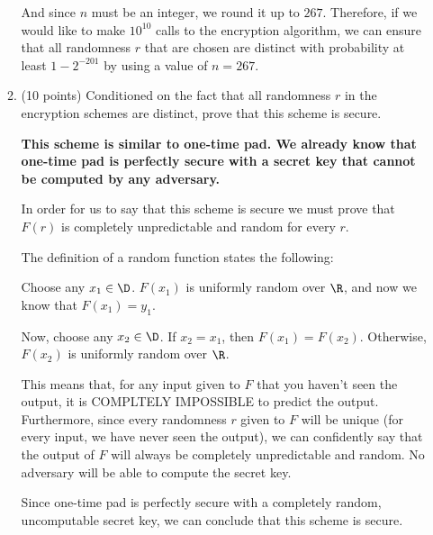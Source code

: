 \documentclass[11pt]{article}
\begin{document}
\begin{enumerate}
\begin{enumerate}
{      And since $n$ must be an integer, we round it up to $267$. Therefore, if we would like to make $10^{10}$ calls to the encryption algorithm, we can ensure that all randomness $r$ that are chosen are distinct with probability at least $1-2^{-201}$ by using a value of $n=267$.

    }
     \newpage

  \item (10 points) Conditioned on the fact that all randomness $r$ in the encryption schemes are distinct, prove that this scheme is secure. \newline 
    {\bfseries
      This scheme is similar to one-time pad. We already know that one-time pad is perfectly secure with a secret key that cannot be computed by any adversary. \newline

      In order for us to say that this scheme is secure we must prove that $F(r)$ is completely unpredictable and random for every $r$.  \newline


      The definition of a random function states the following: \newline

      Choose any $x_1 \in \D$. \newline
      $F(x_1)$ is uniformly random over $\R$, and now we know that $F(x_1) = y_1$. \newline

      Now, choose any $x_2 \in \D$. \newline
      If $x_2 = x_1$, then $F(x_1) = F(x_2)$. Otherwise, $F(x_2)$ is uniformly random over $\R$. \newline

      This means that, for any input given to $F$ that you haven't seen the output, it is COMPLTELY IMPOSSIBLE to predict the output. Furthermore, since every randomness $r$ given to $F$ will be unique (for every input, we have never seen the output), we can confidently say that the output of $F$ will always be completely unpredictable and random. No adversary will be able to compute the secret key.

      Since one-time pad is perfectly secure with a completely random, uncomputable secret key, we can conclude that this scheme is secure.
    }
     \newpage

  \end{enumerate}
 


\end{enumerate}
\end{document}

